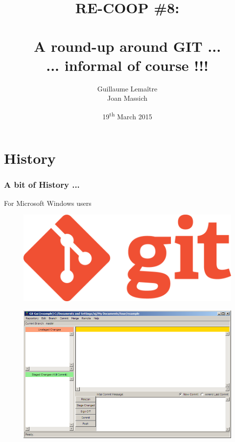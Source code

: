 \documentclass{beamer}
\title{RE-COOP \#8: \\ \  \\ {\Large A round-up around GIT ... \\ ... informal of course !!!}}
\author{Guillaume Lema\^itre \\ Joan Massich}
\date{19\textsuperscript{th} March 2015}
\institute{Universitat de Girona, Universit\'e de Bourgogne}
\begin{document}
\begin{frame}
  \titlepage
\end{frame}

\begin{frame}
  \tableofcontents[sectionstyle=show,subsectionstyle=show,subsubsectionstyle=hide]
\end{frame}

\section{History}


\begin{frame}
  \frametitle{A bit of History ...}
  \begin{block}{For Microsoft Windows users}
    \begin{figure}
      \centering
      \includegraphics[width=.2\textwidth]{./images/git-logo.png}
    \end{figure}
    \begin{figure}
      \centering
      \includegraphics[width=.6\textwidth]{./images/git-windows.png}
    \end{figure}
  \end{block}
\end{frame}
\end{document}
